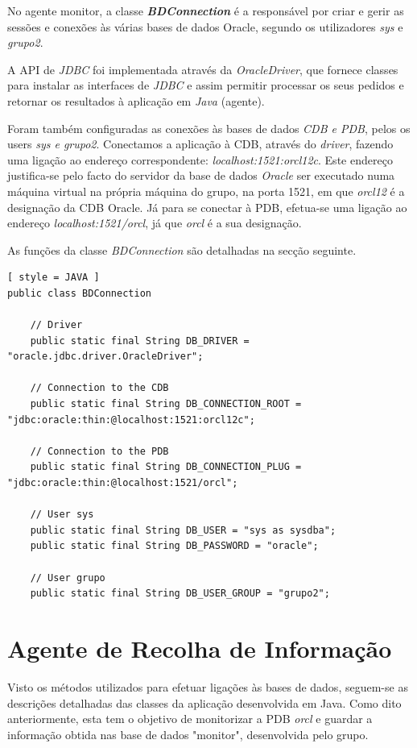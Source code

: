 \documentclass[a4paper]{article}
\begin{document}
No agente monitor, a classe \emph{\textbf{BDConnection}} é a responsável por criar e gerir as sessões e conexões às várias bases de dados Oracle, segundo os utilizadores \emph{sys} e \emph{grupo2}.

A API de \emph{JDBC} foi implementada através da \emph{OracleDriver}, que fornece classes para instalar as interfaces de \emph{JDBC} e assim permitir processar os seus pedidos e retornar os resultados à aplicação em \emph{Java} (agente).

Foram também configuradas as conexões às bases de dados \emph{CDB e PDB}, pelos os users \emph{sys e grupo2}. Conectamos a aplicação à CDB, através do \emph{driver}, fazendo uma ligação ao endereço correspondente: \emph{localhost:1521:orcl12c}. Este endereço justifica-se pelo facto do servidor da base de dados \emph{Oracle} ser executado numa máquina virtual na própria máquina do grupo, na porta 1521, em que \emph{orcl12} é a designação da CDB Oracle. Já para se conectar à PDB, efetua-se uma ligação ao endereço \emph{localhost:1521/orcl}, já que \emph{orcl} é a sua designação.

As funções da classe \emph{BDConnection} são detalhadas na secção seguinte.

\begin{lstlisting}[ style = JAVA ]
public class BDConnection
    
    // Driver
    public static final String DB_DRIVER = "oracle.jdbc.driver.OracleDriver";
    
    // Connection to the CDB
    public static final String DB_CONNECTION_ROOT = "jdbc:oracle:thin:@localhost:1521:orcl12c";
    
    // Connection to the PDB
    public static final String DB_CONNECTION_PLUG = "jdbc:oracle:thin:@localhost:1521/orcl";
    
    // User sys
    public static final String DB_USER = "sys as sysdba";
    public static final String DB_PASSWORD = "oracle";
    
    // User grupo
    public static final String DB_USER_GROUP = "grupo2";

\end{lstlisting}


\section{Agente de Recolha de Informação}
\hspace{3mm} 

Visto os métodos utilizados para efetuar ligações às bases de dados, seguem-se as descrições detalhadas das classes da aplicação desenvolvida em Java. Como dito anteriormente, esta tem o objetivo de monitorizar a PDB \emph{orcl} e guardar a informação obtida nas base de dados "monitor", desenvolvida pelo grupo. 
\end{document}
